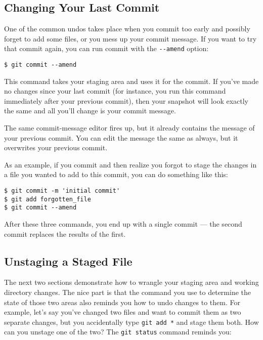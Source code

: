 \documentclass[a4paper]{book}
\begin{document}
\subsection{Changing Your Last Commit}\label{changing-your-last-commit}

One of the common undos takes place when you commit too early and possibly forget to add some files, or you mess up your commit message. If you want to try that commit again, you can run commit with the \texttt{-{}-amend} option:

\begin{shaded}\begin{verbatim}
$ git commit --amend
\end{verbatim}\end{shaded}

This command takes your staging area and uses it for the commit. If you've made no changes since your last commit (for instance, you run this command immediately after your previous commit), then your snapshot will look exactly the same and all you'll change is your commit message.

The same commit-message editor fires up, but it already contains the message of your previous commit. You can edit the message the same as always, but it overwrites your previous commit.

As an example, if you commit and then realize you forgot to stage the changes in a file you wanted to add to this commit, you can do something like this:

\begin{shaded}\begin{verbatim}
$ git commit -m 'initial commit'
$ git add forgotten_file
$ git commit --amend
\end{verbatim}\end{shaded}

After these three commands, you end up with a single commit --- the second commit replaces the results of the first.

\subsection{Unstaging a Staged File}\label{unstaging-a-staged-file}

The next two sections demonstrate how to wrangle your staging area and working directory changes. The nice part is that the command you use to determine the state of those two areas also reminds you how to undo changes to them. For example, let's say you've changed two files and want to commit them as two separate changes, but you accidentally type \texttt{git add *} and stage them both. How can you unstage one of the two? The \texttt{git status} command reminds you:
\end{document}
